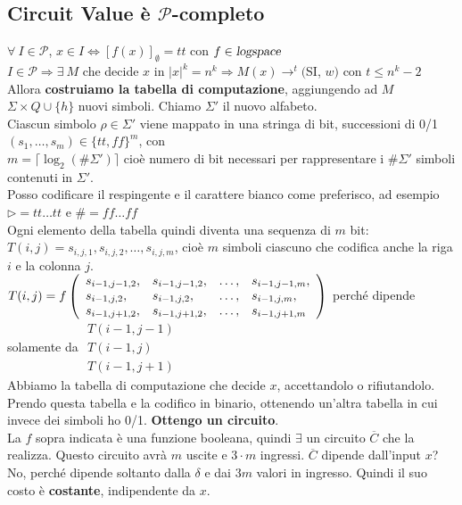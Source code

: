 \documentclass[10pt]{book}
\begin{document}
\subsection{Circuit Value è $\mathscr{P}$-completo}
$\forall\:I\in\mathscr{P}$, $x \in I \Leftrightarrow [f(x)]_\emptyset = tt$ con $f \in \textsl{logspace}$\\
$I\in\mathscr{P} \Rightarrow \exists\:M$ che decide $x$ in $|x|^k = n^k \Rightarrow M(x) \rightarrow^t ($SI, $w)$ con $t \leq n^k - 2$\\
Allora \textbf{costruiamo la tabella di computazione}, aggiungendo ad $M$ $\Sigma \times Q \cup \{h\}$ nuovi simboli. Chiamo $\Sigma'$ il nuovo alfabeto.\\
Ciascun simbolo $\rho \in \Sigma'$ viene mappato in una stringa di bit, successioni di 0/1 $(s_1,\ldots,s_m)\in\{tt, ff\}^m$, con\\$m = \lceil\log_2(\#\Sigma')\rceil$ cioè numero di bit necessari per rappresentare i $\#\Sigma'$ simboli contenuti in $\Sigma'$.\\
Posso codificare il respingente e il carattere bianco come preferisco, ad esempio $\triangleright = tt\ldots tt$ e $\# = ff\ldots ff$\\
Ogni elemento della tabella quindi diventa una sequenza di $m$ bit: $T(i, j) = s_{i,j,1}, s_{i,j,2},\ldots,s_{i,j,m}$, cioè $m$ simboli ciascuno che codifica anche la riga $i$ e la colonna $j$.\\
$T(i,j) = f\left( \begin{array}{l l l l}
	s_{i-1,j-1,2}, & s_{i-1,j-1,2}, &\ldots, &s_{i-1,j-1,m},\\
	s_{i-1,j,2}, &s_{i-1,j,2}, &\ldots, &s_{i-1,j,m},\\
	s_{i-1,j+1,2}, &s_{i-1,j+1,2},&\ldots, &s_{i-1,j+1,m}
\end{array}
\right)$
perché dipende solamente da $\begin{array}{l}
T(i-1, j-1)\\T(i-1,j)\\T(i-1,j+1)
\end{array}$\\
Abbiamo la tabella di computazione che decide $x$, accettandolo o rifiutandolo. Prendo questa tabella e la codifico in binario, ottenendo un'altra tabella in cui invece dei simboli ho 0/1. \textbf{Ottengo un circuito}.\\
La $f$ sopra indicata è una funzione booleana, quindi $\exists$ un circuito $\overline{C}$ che la realizza. Questo circuito avrà $m$ uscite e $3\cdot m$ ingressi. $\overline{C}$ dipende dall'input $x$? No, perché dipende soltanto dalla $\delta$ e dai $3m$ valori in ingresso. Quindi il suo costo è \textbf{costante}, indipendente da $x$.\\
\end{document}
